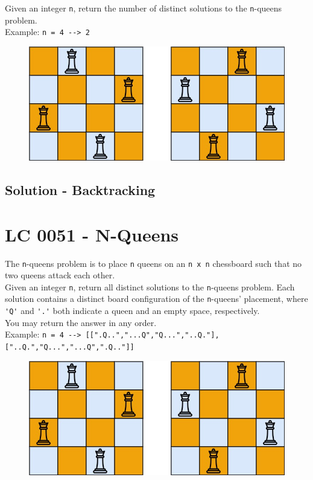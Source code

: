 Given an integer {\colorbox{CodeBackground}{\lstinline|n|}}, return the number of distinct solutions to the {\colorbox{CodeBackground}{\lstinline|n|}}-queens problem.\\

Example: {\colorbox{CodeBackground}{\lstinline|n = 4 --> 2|}}
\begin{figure}[H]
	\centering
	\includegraphics[width=0.45\linewidth]{images/lc0051_example}
	\label{fig:lc0052example}
\end{figure}

\subsection*{Solution - Backtracking}

\section{LC 0051 - N-Queens}
The {\colorbox{CodeBackground}{\lstinline|n|}}-queens problem is to place {\colorbox{CodeBackground}{\lstinline|n|}} queens on an {\colorbox{CodeBackground}{\lstinline|n x n|}} chessboard such that no two queens attack each other.\\

Given an integer {\colorbox{CodeBackground}{\lstinline|n|}}, return all distinct solutions to the {\colorbox{CodeBackground}{\lstinline|n|}}-queens problem. Each solution contains a distinct board configuration of the {\colorbox{CodeBackground}{\lstinline|n|}}-queens' placement, where {\colorbox{CodeBackground}{\lstinline|'Q'|}} and {\colorbox{CodeBackground}{\lstinline|'.'|}} both indicate a queen and an empty space, respectively.\\

You may return the answer in any order.\\

Example: {\colorbox{CodeBackground}{\lstinline|n = 4 --> [[".Q..","...Q","Q...","..Q."],["..Q.","Q...","...Q",".Q.."]]|}}
\begin{figure}[H]
	\centering
	\includegraphics[width=0.45\linewidth]{images/lc0051_example}
	\label{fig:lc0051example}
\end{figure}

